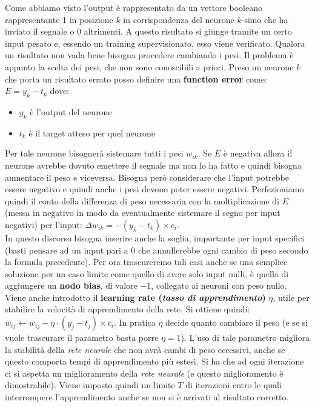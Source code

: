 Come abbiamo visto l'output è rappresentato da un vettore booleano rappresentante 1 in posizione $k$ in corrispondenza del neurone $k$-simo che ha inviato il segnale o 0 altrimenti. A questo risultato si giunge tramite un certo input pesato e, essendo un training supervisionato, esso viene verificato. Qualora un risultato non vada bene bisogna procedere cambiando i pesi. Il problema è appunto la scelta dei pesi, che non sono conoscibili a priori. Preso un neurone $k$ che porta un risultato errato posso definire una \textbf{function error} come: $E=y_k-t_k$ dove: 
\begin{itemize} 
    \item $y_k$ è l'output del neurone 
    \item $t_k$ è il target atteso per quel neurone 
\end{itemize} 
Per tale neurone bisognerà sistemare tutti i pesi $w_{ik}$. Se $E$ è negativa allora il neurone avrebbe dovuto emettere il segnale ma non lo ha fatto e quindi bisogna aumentare il peso e viceversa. Bisogna però considerare che l'input potrebbe essere negativo e quindi anche i pesi devono poter essere negativi. Perfezioniamo quindi il conto della differenza di peso necessaria con la moltiplicazione di $E$ (messa in negativo in modo da eventualmente sistemare il segno per input negativi) per l'input: $\Delta w_{ik}=-(y_k-t_k)\times c_i$. \\ 
In questo discorso bisogna inserire anche la soglia, importante per input specifici (basti pensare ad un input pari a 0 che annullerebbe ogni cambio di peso secondo la formula precedente). Per ora trascureremo tali casi anche se una semplice soluzione per un caso limite come quello di avere solo input nulli, è quella di aggiungere un \textbf{nodo bias}, di valore $-1$, collegato ai neuroni con peso nullo.\\ Viene anche introdotto il \textbf{learning rate (\textit{tasso di apprendimento})} $\eta$, utile per stabilire la velocità di apprendimento della rete. Si ottiene quindi: $w_{ij}\gets w_{ij}-\eta\cdot(y_j-t_j)\times c_i$. In pratica $\eta$ decide quanto cambiare il peso (e se si vuole trascurare il parametro basta porre $\eta = 1$). L'uso di tale parametro migliora la stabilità della \textit{rete neurale} che non avrà cambi di peso eccessivi, anche se questo comporta tempi di apprendimento più estesi. Si ha che ad ogni iterazione ci si aspetta un miglioramento della \textit{rete neurale} (e questo miglioramento è dimostrabile). Viene imposto quindi un limite $T$ di iterazioni entro le quali interrompere l'apprendimento anche se non si è arrivati al risultato corretto.\\
